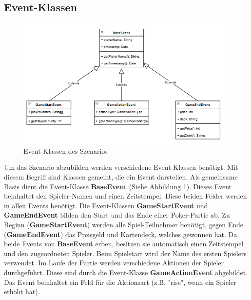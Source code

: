 \subsection{Event-Klassen}
\begin{figure}[ht]
	\centering
	\includegraphics[width=\textwidth,height=\textheight,keepaspectratio]{images/Events.png}
	\caption{Event Klassen des Szenarios}
	\label{EventKlassen}
\end{figure}
Um das Szenario abzubilden werden verschiedene Event-Klassen benötigt. Mit diesem Begriff sind Klassen gemeint, die ein Event darstellen. Als gemeinsame Basis dient die Event-Klasse \textbf{BaseEvent} (Siehe Abbildung \ref{EventKlassen}). Dieses Event beinhaltet den Spieler-Namen und einen Zeitstempel. Diese beiden Felder werden in allen Events benötigt.
\absatz
Die Event-Klassen \textbf{GameStartEvent} und \textbf{GameEndEvent} bilden den Start und das Ende einer Poker-Partie ab. Zu Beginn (\textbf{GameStartEvent}) werden alle Spiel-Teilnehmer benötigt, gegen Ende (\textbf{GameEndEvent}) das Preisgeld und Kartendeck, welches gewonnen hat. Da beide Events von \textbf{BaseEvent} erben, besitzen sie automatisch einen Zeitstempel und den zugeordneten Spieler. Beim Spielstart wird der Name des ersten Spielers verwendet.
\absatz
Im Laufe der Partie werden verschiedene Aktionen der Spieler durchgeführt. Diese sind durch die Event-Klasse \textbf{GameActionEvent} abgebildet. Das Event beinhaltet ein Feld für die Aktionsart (z.B. "rise", wenn ein Spieler erhöht hat).

